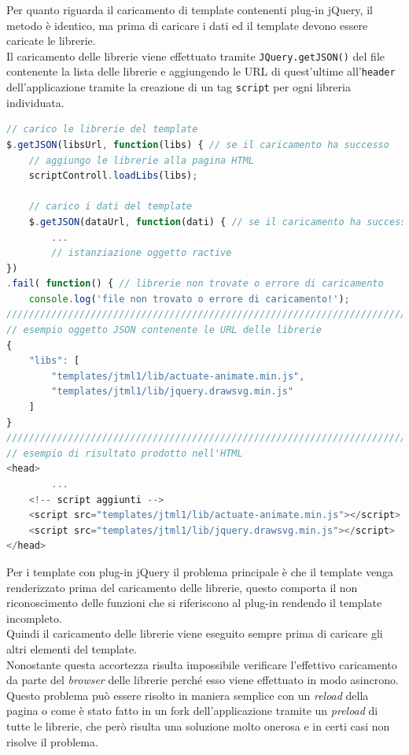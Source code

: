 Per quanto riguarda il caricamento di template contenenti plug-in jQuery, il metodo è identico, ma prima di caricare i dati ed il template devono essere caricate le librerie.\\
Il caricamento delle librerie viene effettuato tramite \texttt{JQuery.getJSON()} del file contenente la lista delle librerie e aggiungendo le URL di quest'ultime all'\texttt{header} dell'applicazione tramite la creazione di un tag \texttt{script} per ogni libreria individuata.\\
\begin{lstlisting}[language=JavaScript, caption=Codice per l'aggiunta delle librerie più esempio di JSON e risultato ottenuto.]
// carico le librerie del template
$.getJSON(libsUrl, function(libs) { // se il caricamento ha successo
	// aggiungo le librerie alla pagina HTML
	scriptControll.loadLibs(libs);

	// carico i dati del template
	$.getJSON(dataUrl, function(dati) { // se il caricamento ha successo
		...
		// istanziazione oggetto ractive
})
.fail( function() { // librerie non trovate o errore di caricamento
	console.log('file non trovato o errore di caricamento!');
///////////////////////////////////////////////////////////////////////
// esempio oggetto JSON contenente le URL delle librerie
{
	"libs": [
		"templates/jtml1/lib/actuate-animate.min.js",
		"templates/jtml1/lib/jquery.drawsvg.min.js"
	]
}
///////////////////////////////////////////////////////////////////////
// esempio di risultato prodotto nell'HTML
<head>
		...
	<!-- script aggiunti -->
	<script src="templates/jtml1/lib/actuate-animate.min.js"></script>
	<script src="templates/jtml1/lib/jquery.drawsvg.min.js"></script>
</head>

\end{lstlisting}
Per i template con plug-in jQuery il problema principale è che il template venga renderizzato prima del caricamento delle librerie, questo comporta il non riconoscimento delle funzioni che si riferiscono al plug-in rendendo il template incompleto.\\
Quindi il caricamento delle librerie viene eseguito sempre prima di caricare gli altri elementi del template.\\
Nonostante questa accortezza risulta impossibile verificare l'effettivo caricamento da parte del \textit{browser} delle librerie perché esso viene effettuato in modo asincrono.\\
Questo problema può essere risolto in maniera semplice con un \textit{reload} della pagina o come è stato fatto in un fork dell'applicazione tramite un \textit{preload} di tutte le librerie, che però risulta una soluzione molto onerosa e in certi casi non risolve il problema.

